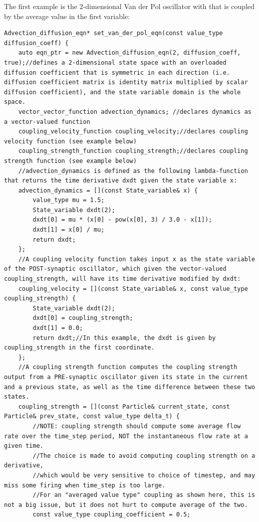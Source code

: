 \documentclass[10pt]{article} %
\begin{document}
The first example is the $2$-dimensional Van der Pol oscillator with that is coupled by the average value in the first variable:
\begin{lstlisting}
Advection_diffusion_eqn* set_van_der_pol_eqn(const value_type diffusion_coeff) {
    auto eqn_ptr = new Advection_diffusion_eqn(2, diffusion_coeff, true);//defines a 2-dimensional state space with an overloaded diffusion coefficient that is symmetric in each direction (i.e. diffusion coefficient matrix is identity matrix multiplied by scalar diffusion coefficient), and the state variable domain is the whole space.
    vector_vector_function advection_dynamics; //declares dynamics as a vector-valued function
    coupling_velocity_function coupling_velocity;//declares coupling velocity function (see example below)
    coupling_strength_function coupling_strength;//declares coupling strength function (see example below)
    //advection_dynamics is defined as the following lambda-function that returns the time derivative dxdt given the state variable x:
    advection_dynamics = [](const State_variable& x) {
        value_type mu = 1.5;
        State_variable dxdt(2);
        dxdt[0] = mu * (x[0] - pow(x[0], 3) / 3.0 - x[1]);
        dxdt[1] = x[0] / mu;
        return dxdt;
    };
    //A coupling velocity function takes input x as the state variable of the POST-synaptic oscillator, which given the vector-valued coupling_strength, will have its time derivative modified by dxdt:
    coupling_velocity = [](const State_variable& x, const value_type coupling_strength) {
        State_variable dxdt(2);
        dxdt[0] = coupling_strength;
        dxdt[1] = 0.0;
        return dxdt;//In this example, the dxdt is given by coupling_strength in the first coordinate.
    };
    //A coupling strength function computes the coupling strength output from a PRE-synaptic oscillator given its state in the current and a previous state, as well as the time difference between these two states.
    coupling_strength = [](const Particle& current_state, const Particle& prev_state, const value_type delta_t) {
        //NOTE: coupling strength should compute some average flow rate over the time_step period, NOT the instantaneous flow rate at a given time. 
        //The choice is made to avoid computing coupling strength on a derivative, 
        //which would be very sensitive to choice of timestep, and may miss some firing when time_step is too large. 
        //For an "averaged value type" coupling as shown here, this is not a big issue, but it does not hurt to compute average of the two. 
        const value_type coupling_coefficient = 0.5;

\end{lstlisting}
\end{document}
